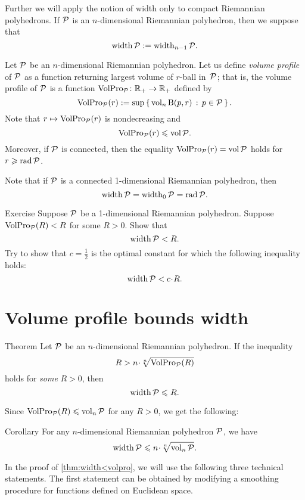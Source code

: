Further we will apply the notion of width only to compact Riemannian polyhedrons.
If $\mathcal{P}$ is an $n$-dimensional Riemannian polyhedron, then 
we suppose that
\[\operatorname{\rm width}\nolimits\mathcal{P}\mathrel{:=}\operatorname{\rm width}\nolimits_{n-1}\mathcal{P}.\]


Let $\mathcal{P}$ be an $n$-dimensional Riemannian polyhedron.
Let us define \emph{volume profile} of $\mathcal{P}$ as a function 
returning largest volume of $r$-ball in~$\mathcal{P}$;
that is, the volume profile of $\mathcal{P}$ is a function $\operatorname{\rm VolPro}\nolimits_{\mathcal{P}}\colon\mathbb{R}_+\to\mathbb{R}_+$ defined by 
\[\operatorname{\rm VolPro}\nolimits_{\mathcal{P}}(r)\mathrel{:=} \sup\left\{\,{\operatorname{\rm vol}\nolimits_n \mathrm{B}{}(p,r)}\,:\,{p\in\mathcal{P}}\,\right\}.\]
Note that 
$r\mapsto \operatorname{\rm VolPro}\nolimits_{\mathcal{P}}(r)$ is nondecreasing  and
\[\operatorname{\rm VolPro}\nolimits_{\mathcal{P}}(r)\leqslant\operatorname{\rm vol}\nolimits\mathcal{P}.\]
Moreover, if $\mathcal{P}$ is connected, then the equality $\operatorname{\rm VolPro}\nolimits_{\mathcal{P}}(r)=\operatorname{\rm vol}\nolimits\mathcal{P}$ holds
for $r\geqslant \mathop{\rm rad}\nolimits \mathcal{P}$.

Note that if $\mathcal{P}$ is a connected 1-dimensional Riemannian polyhedron, then 
\[\operatorname{\rm width}\nolimits\mathcal{P}=\operatorname{\rm width}\nolimits_0\mathcal{P}=\mathop{\rm rad}\nolimits\mathcal{P}.\]

\begin{thm}{Exercise}\label{ex:1D-case}
Suppose $\mathcal{P}$ be a 1-dimensional Riemannian polyhedron.
Suppose $\operatorname{\rm VolPro}\nolimits_{\mathcal{P}}(R)<R$ for some $R>0$.
Show that 
\[\operatorname{\rm width}\nolimits \mathcal{P}<R.\]
Try to show that $c=\tfrac 12$ is the optimal constant for which the following inequality holds: 
\[\width \spc{P}<c\cdot R.\]
\end{thm}

\section{Volume profile bounds width}

\begin{thm}{Theorem}\label{thm:width<volpro}
Let $\mathcal{P}$ be an $n$-dimensional Riemannian polyhedron. 
If the inequality 
\[R> n\cdot \sqrt[n]{\VolPro_{\spc{P}}(R)}\]
holds for {}\emph{some} $R>0$, then 
\[\operatorname{\rm width}\nolimits\mathcal{P}\leqslant  R.\]
\end{thm}

Since $\operatorname{\rm VolPro}\nolimits_{\mathcal{P}}(R)\leqslant \operatorname{\rm vol}\nolimits_n\mathcal{P}$ for any $R>0$,
we get the following:

\begin{thm}{Corollary}\label{thm:width<vol}
For any $n$-dimensional Riemannian polyhedron $\mathcal{P}$, we have
\[\width\spc{P}\le n\cdot \sqrt[n]{\vol_n\spc{P}}.\]

\end{thm}

In the proof of \ref{thm:width<volpro}, we will use the following three technical statements.
The first statement can be obtained by modifying a smoothing procedure for functions defined on Euclidean space. 

